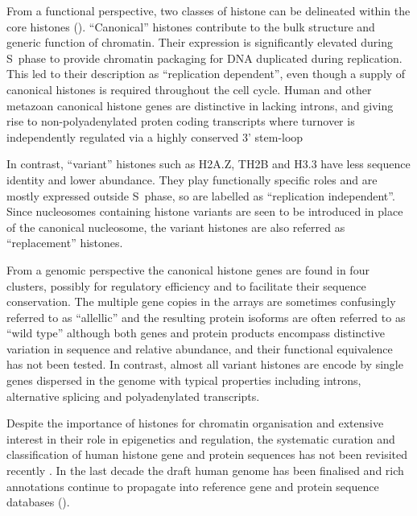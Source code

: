   From a functional perspective, two classes of histone can be delineated within the core histones (). 
  ``Canonical'' histones contribute to the bulk structure and generic function of chromatin. 
  Their expression is significantly elevated during S~phase to provide chromatin packaging 
  for DNA duplicated during replication. This led to their description as ``replication dependent'', 
  even though a supply of canonical histones is required throughout the cell cycle. 
  Human and other metazoan canonical histone genes are distinctive in lacking introns, 
  and giving rise to non-polyadenylated proten coding transcripts 
  where turnover is independently regulated via a highly conserved 3' stem-loop
  
  In contrast, ``variant'' histones such as H2A.Z, TH2B and H3.3 have less sequence identity and lower abundance. 
  They play functionally specific roles and are mostly expressed outside S~phase, 
  so are labelled as ``replication independent''. 
  Since nucleosomes containing histone variants are seen to be introduced in place of the canonical nucleosome, 
  the variant histones are also referred as ``replacement'' histones.
  
  From a genomic perspective the canonical histone genes are found in four clusters, 
  possibly for regulatory efficiency and to facilitate their sequence conservation. 
  The multiple gene copies in the arrays are sometimes confusingly referred to as ``allellic'' 
  and the resulting protein isoforms are often referred to as ``wild type'' 
  although both genes and protein products encompass distinctive variation in sequence and relative abundance, 
  and their functional equivalence has not been tested.
  In contrast, almost all variant histones are encode by single genes dispersed in the genome 
  with typical properties including introns, alternative splicing and polyadenylated transcripts.
  
  Despite the importance of histones for chromatin organisation and extensive interest
  in their role in epigenetics and regulation, the systematic curation and classification of human histone
  gene and protein sequences has not been revisited recently \citep{Marzluff02}.
  In the last decade the draft human genome has been finalised 
  and rich annotations continue to propagate into reference gene and protein sequence databases ().


